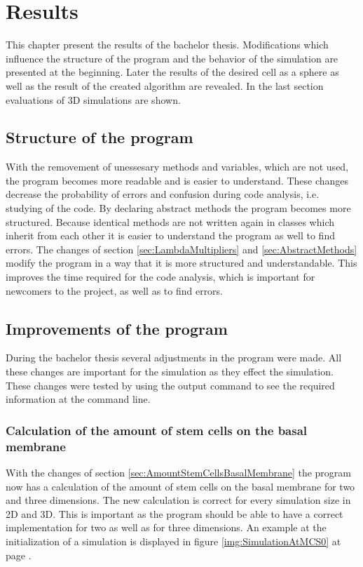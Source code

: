 \chapter{Results}
This chapter present the results of the bachelor thesis. Modifications which influence the structure of the program and the behavior of the simulation are presented at the beginning. Later the results of the desired cell as a sphere as well as the result of the created algorithm are revealed. In the last section evaluations of 3D simulations are shown.

\section{Structure of the program}
With the removement of unessesary methods and variables, which are not used, the program becomes more readable and is easier to understand. These changes decrease the probability of errors and confusion during code analysis, i.e. studying of the code. By declaring abstract methods the program becomes more structured. Because identical methods are not written again in classes which inherit from each other it is easier to understand the program as well to find errors. \newline
The changes of section \ref{sec:LambdaMultipliers} and \ref{sec:AbstractMethods} modify the program in a way that it is more structured and understandable. This improves the time required for the code analysis, which is important for newcomers to the project, as well as to find errors. 

\section{Improvements of the program}
During the bachelor thesis several adjustments in the program were made. All these changes are important for the simulation as they effect the simulation. These changes were tested by using the output command to see the required information at the command line. 
\subsection{Calculation of the amount of stem cells on the basal membrane}
With the changes of section \ref{sec:AmountStemCellsBasalMembrane} the program now has a calculation of the amount of stem cells on the basal membrane for two and three dimensions. The new calculation is correct for every simulation size in 2D and 3D. This is important as the program should be able to have a correct implementation for two as well as for three dimensions. An example at the initialization of a simulation is displayed in figure \ref{img:SimulationAtMCS0} at page \pageref{img:SimulationAtMCS0}.
